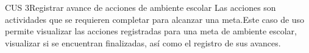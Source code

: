 \begin{UseCase}{CUS 3}{Registrar avance de acciones de ambiente escolar}
    {
    Las acciones son actividades que se requieren completar para alcanzar una meta.Este caso de uso permite visualizar las acciones registradas para una meta de ambiente escolar, visualizar si se encuentran finalizadas, así como el registro de sus avances. 
    }
    

    


\end{UseCase}
